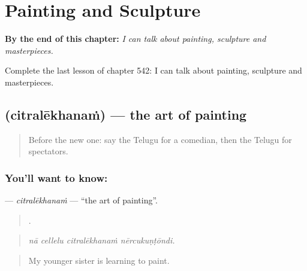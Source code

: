 
\chapter{Painting and Sculpture}
\label{ch:te-painting-and-sculpture}

\begin{chapteropening}
\textbf{By the end of this chapter:} \emph{I can talk about painting, sculpture and masterpieces.}

Complete the last lesson of chapter 542: I can talk about painting, sculpture and masterpieces.
\end{chapteropening}

\section[\texorpdfstring{\te{చిత్రలేఖనం} (citralēkhanaṁ)}{చిత్రలేఖనం (citralēkhanaṁ)}]{ (citralēkhanaṁ) — the art of painting}

\label{lesson:TE-C542-citralekhanam}



\begin{quote}
Before the new one: say the Telugu for a comedian, then the Telugu for spectators.
\end{quote}

\subsection*{You'll want to know: }
\textbf{} — \emph{citralēkhanaṁ} — \textquotedblleft{}the art of painting\textquotedblright{}.

\begin{quote}
   .
\end{quote}

\begin{quote}
\emph{nā cellelu citralēkhanaṁ nērcukuṇṭōndi.}
\end{quote}

\begin{quote}
My younger sister is learning to paint.
\end{quote}

